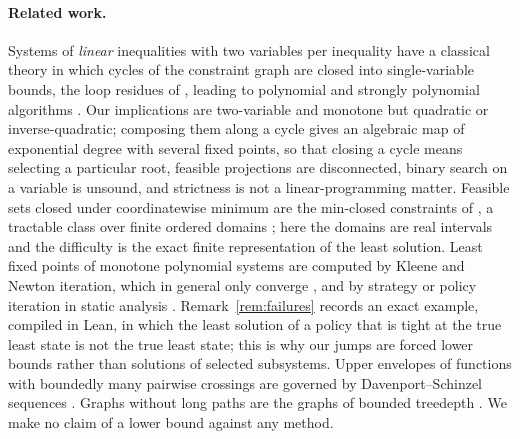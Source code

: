 \documentclass[11pt,a4paper]{article}
\theoremstyle{plain}
\theoremstyle{definition}
\theoremstyle{remark}
\begin{document}
\paragraph{Related work.} Systems of \emph{linear} inequalities with two variables per inequality have a classical theory in which cycles of the constraint graph are closed into single-variable bounds, the loop residues of \citet{shostak1981}, leading to polynomial and strongly polynomial algorithms \citep{aspvall1980,hochbaum1994,dadush2020}. Our implications are two-variable and monotone but quadratic or inverse-quadratic; composing them along a cycle gives an algebraic map of exponential degree with several fixed points, so that closing a cycle means selecting a particular root, feasible projections are disconnected, binary search on a variable is unsound, and strictness is not a linear-programming matter. Feasible sets closed under coordinatewise minimum are the min-closed constraints of \citet{jeavons1995}, a tractable class over finite ordered domains \citep{cooper2010}; here the domains are real intervals and the difficulty is the exact finite representation of the least solution. Least fixed points of monotone polynomial systems are computed by Kleene and Newton iteration, which in general only converge \citep{etessami2009,esparza2010}, and by strategy or policy iteration in static analysis \citep{costan2005,gawlitza2007}. Remark~\ref{rem:failures} records an exact example, compiled in Lean, in which the least solution of a policy that is tight at the true least state is not the true least state; this is why our jumps are forced lower bounds rather than solutions of selected subsystems. Upper envelopes of functions with boundedly many pairwise crossings are governed by Davenport--Schinzel sequences \citep{sharir1995}. Graphs without long paths are the graphs of bounded treedepth \citep{nesetril2012}. We make no claim of a lower bound against any method.
\end{document}

